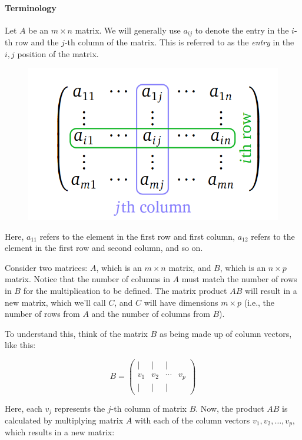 \documentclass[a4paper,12pt]{article}
\begin{document}
\paragraph{Terminology}Let \( A \) be an \( m \times n \) matrix. We will generally use \( a_{ij} \) to denote the entry in the \( i \)-th row and the \( j \)-th column of the matrix. This is referred to as the \textit{entry} in the \( i, j \) position of the matrix.
\begin{figure}[H]
    \centering
    \includegraphics[width=1\linewidth]{matrixMultiplication.png}
    \label{fig:matrix-multiplication-notation}
\end{figure}
Here, \( a_{11} \) refers to the element in the first row and first column, \( a_{12} \) refers to the element in the first row and second column, and so on.\\
\begin{tcolorbox}[title=Definition (Matrix multiplication),colframe=blue!70!black, colback=blue!5!white]
Consider two matrices: \( A \), which is an \( m \times n \) matrix, and \( B \), which is an \( n \times p \) matrix. Notice that the number of columns in \( A \) must match the number of rows in \( B \) for the multiplication to be defined. The matrix product \( AB \) will result in a new matrix, which we’ll call \( C \), and \( C \) will have dimensions \( m \times p \) (i.e., the number of rows from \( A \) and the number of columns from \( B \)).

To understand this, think of the matrix \( B \) as being made up of column vectors, like this:

\[
B = \begin{pmatrix} 
| & | & | \\
v_1 & v_2 & \cdots & v_p \\
| & | & |
\end{pmatrix}
\]
\end{tcolorbox}
Here, each \( v_j \) represents the \( j \)-th column of matrix \( B \). Now, the product \( AB \) is calculated by multiplying matrix \( A \) with each of the column vectors \( v_1, v_2, \ldots, v_p \), which results in a new matrix:
\end{document}
